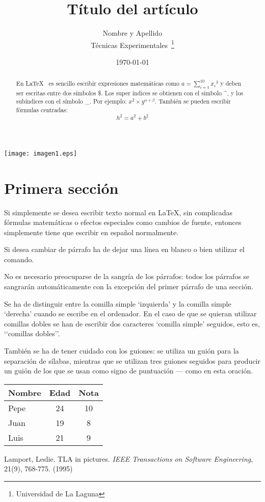 \documentclass[a4paper,12pt]{article}
\begin{document}
\texttt{[image: imagen1.eps]}
\title{Título del artículo}
\author{Nombre y Apellido \\
         Técnicas Experimentales~\footnote{Universidad de La Laguna}
       }
\date{\today}
\maketitle
\begin{abstract}
 En \LaTeX{}~\cite{Lam:86} es sencillo escribir expresiones
 matemáticas como $a=\sum_{i=1}^{10} {x_i}^{3}$
 y deben ser escritas entre dos símbolos \$.
 Los super índices se obtienen con el símbolo \^{}, y
 los subíndices con el símbolo \_.
 Por ejemplo: $x^2 \times y^{\alpha + \beta}$.
 También se pueden escribir fórmulas centradas:
 \[h^2=a^2 + b^2 \]
\end{abstract}

\section{Primera sección}
 Si simplemente se desea escribir texto normal en LaTeX,
 sin complicadas f\'ormulas matem\'aticas o efectos especiales
 como cambios de fuente, entonces simplemente tiene que escribir
 en espa\~nol normalmente.\par
 Si desea cambiar de párrafo ha de dejar una línea en blanco o bien
 utilizar el comando.\par
 No es necesario preocuparse de la sangría de los párrafos:
 todos los párrafos se sangrarán automáticamente con la excepción
 del primer párrafo de una sección.

 Se ha de distinguir entre la comilla simple ‘izquierda’
 y la comilla simple ‘derecha’ cuando se escribe en el ordenador.
 En el caso de que se quieran utilizar comillas dobles se han de
 escribir dos caracteres ‘comilla simple’ seguidos, esto es,
 ‘‘comillas dobles’’.

 También se ha de tener cuidado con los guiones: se utiliza un 
 guión para la separación de sílabas, mientras que se utilizan
 tres guiones seguidos para producir un guión de los que se usan
como signo de puntuación --- como en esta oración.
\bigskip
\begin{tabular}{|l|c|c|}
\hline
 Nombre & Edad & Nota \\ \hline
 Pepe & 24 & 10 \\ \hline
 Juan & 19 & 8 \\ \hline
 Luis & 21 & 9 \\ \hline
\end{tabular}
\begin{thebibliography}{00}
  Lamport, Leslie.
  TLA in pictures.
  \emph{IEEE Transactions on Software Engineering},
  21(9), 768-775.
  (1995)
\end{thebibliography}
\end{document}
